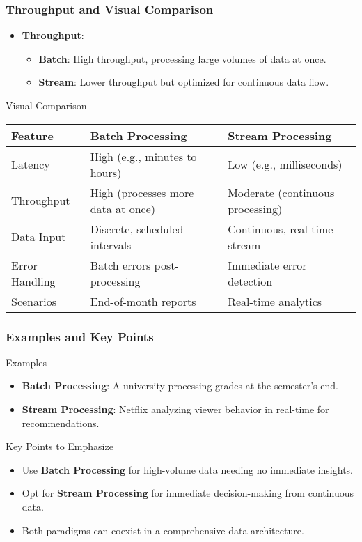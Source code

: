 \documentclass[aspectratio=169]{beamer}
\begin{document}
\begin{frame}[fragile]
    \frametitle{Throughput and Visual Comparison}
    \begin{itemize}
        \item \textbf{Throughput}:
        \begin{itemize}
            \item \textbf{Batch}: High throughput, processing large volumes of data at once.
            \item \textbf{Stream}: Lower throughput but optimized for continuous data flow.
        \end{itemize}
    \end{itemize}

    \begin{block}{Visual Comparison}
        \begin{tabular}{|l|l|l|}
            \hline
            \textbf{Feature} & \textbf{Batch Processing} & \textbf{Stream Processing} \\ \hline
            Latency & High (e.g., minutes to hours) & Low (e.g., milliseconds) \\ \hline
            Throughput & High (processes more data at once) & Moderate (continuous processing) \\ \hline
            Data Input & Discrete, scheduled intervals & Continuous, real-time stream \\ \hline
            Error Handling & Batch errors post-processing & Immediate error detection \\ \hline
            Scenarios & End-of-month reports  & Real-time analytics \\ \hline
        \end{tabular}
    \end{block}
\end{frame}

\begin{frame}[fragile]
    \frametitle{Examples and Key Points}
    \begin{block}{Examples}
        \begin{itemize}
            \item \textbf{Batch Processing}: A university processing grades at the semester's end.
            \item \textbf{Stream Processing}: Netflix analyzing viewer behavior in real-time for recommendations.
        \end{itemize}
    \end{block}

    \begin{block}{Key Points to Emphasize}
        \begin{itemize}
            \item Use \textbf{Batch Processing} for high-volume data needing no immediate insights.
            \item Opt for \textbf{Stream Processing} for immediate decision-making from continuous data.
            \item Both paradigms can coexist in a comprehensive data architecture.
        \end{itemize}
    \end{block}
\end{frame}
\end{document}
